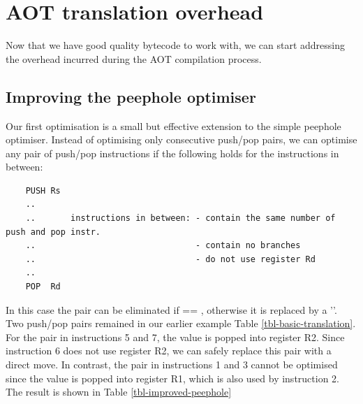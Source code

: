 \section{AOT translation overhead}
\label{sec-optimisations-aot-translation-overhead}
Now that we have good quality bytecode to work with, we can start addressing the overhead incurred during the AOT compilation process.

\subsection{Improving the peephole optimiser}
\label{sec-improved-peephole}


Our first optimisation is a small but effective extension to the simple peephole optimiser. Instead of optimising only consecutive push/pop pairs, we can optimise any pair of push/pop instructions if the following holds for the instructions in between:

\begin{listing}
    \begin{verbatim}
    PUSH Rs
    ..
    ..       instructions in between: - contain the same number of push and pop instr.
    ..                                - contain no branches
    ..                                - do not use register Rd
    ..
    POP  Rd
     \end{verbatim}
\end{listing}

In this case the pair can be eliminated if  == , otherwise it is replaced by a ''. Two push/pop pairs remained in our earlier example Table \ref{tbl-basic-translation}. For the pair in instructions 5 and 7, the value is popped into register R2. Since instruction 6 does not use register R2, we can safely replace this pair with a direct move. In contrast, the pair in instructions 1 and 3 cannot be optimised since the value is popped into register R1, which is also used by instruction 2. The result is shown in Table \ref{tbl-improved-peephole}

